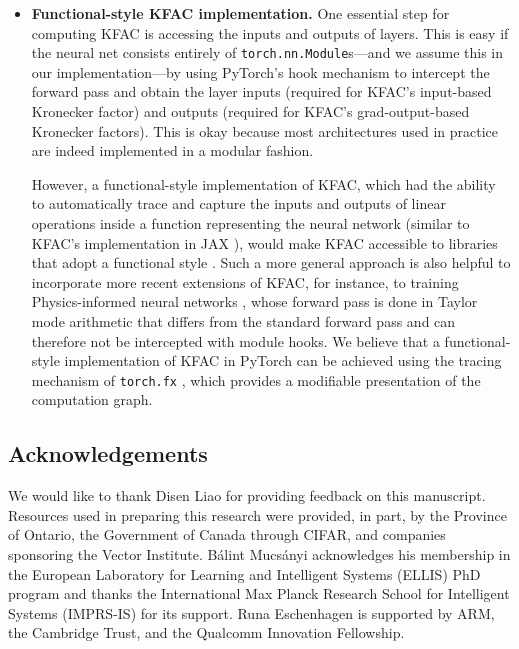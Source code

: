 \begin{itemize}
\item \textbf{Functional-style KFAC implementation.}
  One essential step for computing KFAC is accessing the inputs and outputs of layers.
  This is easy if the neural net consists entirely of \texttt{torch.nn.Module}s---and we assume this in our implementation---by using PyTorch's hook mechanism to intercept the forward pass and obtain the layer inputs (required for KFAC's input-based Kronecker factor) and outputs (required for KFAC's grad-output-based Kronecker factors).
  This is okay because most architectures used in practice are indeed implemented in a modular fashion.

  However, a functional-style implementation of KFAC, which had the ability to automatically trace and capture the inputs and outputs of linear operations inside a function representing the neural network (similar to KFAC's implementation in JAX \cite{botev2022kfac-jax}), would make KFAC accessible to libraries that adopt a functional style \citep[\eg][]{duffield2025scalable}.
  Such a more general approach is also helpful to incorporate more recent extensions of KFAC, for instance, to training Physics-informed neural networks \cite{dangel2024kroneckerfactored}, whose forward pass is done in Taylor mode arithmetic that differs from the standard forward pass and can therefore not be intercepted with module hooks.
  We believe that a functional-style implementation of KFAC in PyTorch can be achieved using the tracing mechanism of \texttt{torch.fx} \cite{reed2022torch}, which provides a modifiable presentation of the computation graph.
\end{itemize}

\subsection*{Acknowledgements}
We would like to thank Disen Liao for providing feedback on this manuscript.
Resources used in preparing this research were provided, in part, by the Province of Ontario, the Government of Canada through CIFAR, and companies sponsoring the Vector Institute.
Bálint Mucsányi acknowledges his membership in the European Laboratory
for Learning and Intelligent Systems (ELLIS) PhD program and thanks the International Max Planck Research School for Intelligent Systems (IMPRS-IS) for its support.
Runa Eschenhagen is supported by ARM, the Cambridge Trust, and the Qualcomm Innovation Fellowship.

